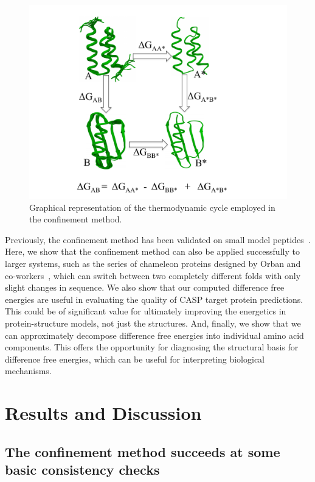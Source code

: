 \documentclass[12pt]{article}
\begin{document}
\begin{figure}
    \begin{center}
        \includegraphics[width=3.5 in]{method.pdf}
    \end{center}
    \caption{Graphical representation of the thermodynamic cycle employed in the confinement method.}
\label{fig:method}
\end{figure}

Previously, the confinement method has been validated on small model peptides~\cite{Tyka2006,Cecchini2009}. Here, we
show that the confinement method can also be applied successfully to larger systems, such as the series of chameleon
proteins designed by Orban and co-workers~\cite{Alexander2007,He2008,Alexander2009,Bryan2010,He2012}, which can switch
between two completely different folds with only slight changes in sequence. We also show that our computed difference
free energies are useful in evaluating the quality of CASP target protein predictions.  This could be of significant
value for ultimately improving the energetics in protein-structure models, not just the structures. And, finally, we
show that we can approximately decompose difference free energies into individual amino acid components. This offers the
opportunity for diagnosing the structural basis for difference free energies, which can be useful for interpreting
biological mechanisms.

\section*{Results and Discussion}

\subsection*{The confinement method succeeds at some basic consistency checks}
\end{document}
